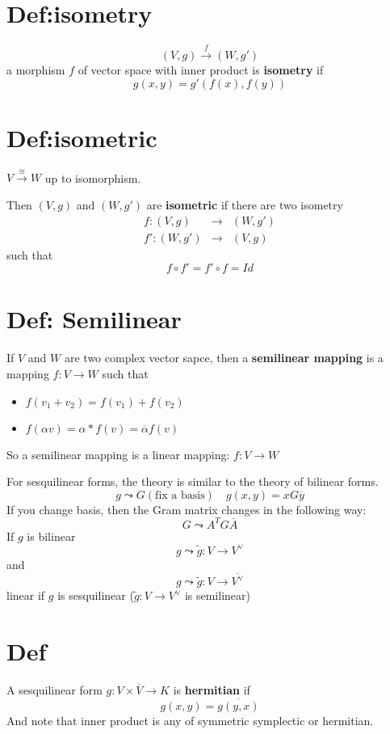 \documentclass{article}
\begin{document}
\section{Def:isometry}
$$(V,g)\stackrel{f}\rightarrow(W,g')$$
a morphism $f$ of vector space with inner product is \textbf{isometry} if $$g(x,y)=g'(f(x),f(y))$$
\section{Def:isometric}
$V\stackrel{\cong}\rightarrow W$ up to isomorphism.

Then $(V,g)$ and $(W,g')$ are \textbf{isometric} if there are two isometry
$$\begin{aligned}
    f:(V,g)&\rightarrow&(W,g')\\
    f':(W,g')&\rightarrow&(V,g)
\end{aligned}$$
such that
$$f\circ f'=f'\circ f=Id$$
\section{Def: Semilinear}
If $V$ and $W$ are two complex vector sapce, then a \textbf{semilinear mapping} is a mapping $f:V\rightarrow W$ such that
\begin{itemize}
    \item $f(v_1+v_2)=f(v_1)+f(v_2)$
    \item $f(\alpha v)=\alpha*f(v)=\overline{\alpha}f(v)$
\end{itemize}
So a semilinear mapping is a linear mapping: $f:V\rightarrow W$

For sesquilinear forms, the theory is similar to the theory of bilinear forms.
$$g\leadsto G(\text{fix a basis})\quad g(x,y)=xG\overline{y}$$
If you change basis, then the Gram matrix changes in the following way:
$$G\leadsto A^TG\overline{A}$$
If $g$ is bilinear
$$g\leadsto \tilde{g}:V\rightarrow V^\vee$$
and $$g\leadsto\tilde{g}:V\rightarrow\overline{V^\vee}$$
linear if $g$ is sesquilinear ($\tilde{g}:V\rightarrow V^\vee$ is semilinear)
\section{Def}
A sesquilinear form $g:V\times \overline{V}\rightarrow K$ is \textbf{hermitian} if
$$g(x,y)=\overline{g(y,x)}$$
And note that inner product is any of symmetric symplectic or hermitian.
\end{document}
